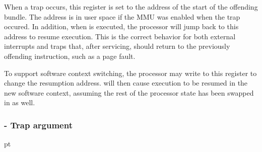 \normalsize\vskip 6pt
\noindent When a trap occurs, this register is set to the address of the start of the
offending bundle. The address is in user space if the MMU was enabled when the
trap occured. In addition, when  is executed, the processor will jump
back to this address to resume execution. This is the correct behavior for both
external interrupts and traps that, after servicing, should return to the
previously offending instruction, such as a page fault.

To support software context switching, the processor may write to this register
to change the resumption address.  will then cause execution to be
resumed in the new software context, assuming the rest of the processor state
has been swapped in as well.
\subsubsection[CR\_TA - Trap argument]{ - Trap argument}
\label{reg:TA}
\label{reg:TA}
 pt\relax\noindent\footnotesize
